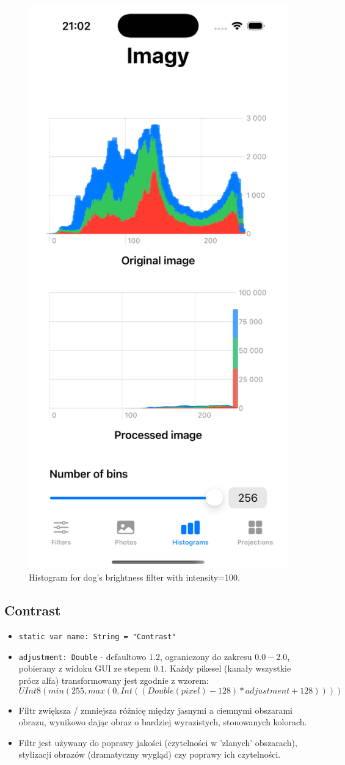 \documentclass[a4paper]{article}
\begin{document}
\begin{figure}[H]
    \centering
    \includegraphics[width=0.25\linewidth]{images/dog_brightness_100_histogram.png}
    \caption{Histogram for dog's brightness filter with intensity=100.}
    \label{fig:dog_brightness_100_histogram}
\end{figure}

\subsection{Contrast}

\begin{itemize}
    \item \texttt{static var name: String = "Contrast"}
    \item \texttt{adjustment: Double} - defaultowo $1.2$, ograniczony do zakresu $0.0-2.0$, pobierany z widoku GUI ze stepem $0.1$. Każdy pikesel (kanały wszystkie prócz alfa) transformowany jest zgodnie z wzorem:\\
          $$
              UInt8(min(255, max(0, Int((Double(pixel) - 128) * adjustment + 128))))
          $$
    \item Filtr zwiększa / zmniejsza różnicę między jasnymi a ciemnymi obszarami obrazu, wynikowo dając obraz o bardziej wyrazistych, stonowanych kolorach.
    \item Filtr jest używany do poprawy jakości (czytelności w 'zlanych' obszarach), stylizacji obrazów (dramatyczny wygląd) czy poprawy ich czytelności.
\end{itemize}
\end{document}
